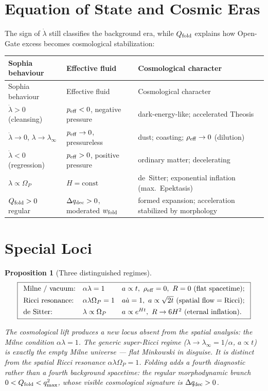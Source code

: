\documentclass[11pt,a4paper]{article}
\newcommand{\Op}{\Omega_P}
\newcommand{\reff}{\rho_{\rm eff}}
\newcommand{\peff}{p_{\rm eff}}
\newcommand{\qdec}{q_{\rm dec}}
\newcommand{\Qfold}{Q_{\rm fold}}
\newcommand{\note}[1]{\textcolor{black!65}{\emph{#1}}}
\theoremstyle{plain}
\newtheorem{proposition}{Proposition}
\theoremstyle{remark}
\theoremstyle{definition}
\begin{document}
\section{Equation of State and Cosmic Eras}
The sign of $\dot\lambda$ still classifies the background era, while $\Qfold$ explains how Open-Gate
excess becomes cosmological stabilization:
\begin{longtable}{>{\raggedright\arraybackslash}p{} >{\raggedright\arraybackslash}p{} >{\raggedright\arraybackslash}p{}}
\toprule
Sophia behaviour & Effective fluid & Cosmological character \\
\midrule
\endfirsthead
\toprule
Sophia behaviour & Effective fluid & Cosmological character \\
\midrule
\endhead
$\dot\lambda>0$ (cleansing) & $\peff<0$, negative pressure & dark-energy-like; accelerated Theosis \\
$\dot\lambda\to0$, $\lambda\to\lambda_\infty$ & $\peff\to0$, pressureless & dust; coasting; $\reff\to0$ (dilution) \\
$\dot\lambda<0$ (regression) & $\peff>0$, positive pressure & ordinary matter; decelerating \\
$\lambda\propto\Op$ & $H=\mathrm{const}$ & de~Sitter; exponential inflation (max.\ Epektasis) \\
$\Qfold>0$ regular & $\Delta\qdec>0$, moderated $w_{\rm fold}$ & formed expansion; acceleration stabilized by morphology \\
\bottomrule
\end{longtable}

\section{Special Loci}\label{sec:loci}
\begin{proposition}[Three distinguished regimes]\label{prop:loci}
\[
\boxed{\begin{array}{lll}
\textnormal{Milne / vacuum:} & \alpha\lambda=1 & a\propto t,\ \reff=0,\ R=0\ (\text{flat spacetime});\\[4pt]
\textnormal{Ricci resonance:} & \alpha\lambda\Op=1 & a\dot a=1,\ a\propto\sqrt{2t}\ (\text{spatial flow}=\text{Ricci});\\[4pt]
\textnormal{de~Sitter:} & \lambda\propto\Op & a\propto e^{Ht},\ R\to6H^2\ (\text{eternal inflation}).
\end{array}}
\]
\end{proposition}
\note{The cosmological lift produces a \emph{new} locus absent from the spatial analysis: the Milne
condition $\alpha\lambda=1$. The generic super-Ricci regime ($\lambda\to\lambda_\infty=1/\alpha$,
$a\propto t$) is exactly the empty Milne universe --- flat Minkowski in disguise. It is distinct from
the spatial Ricci resonance $\alpha\lambda\Op=1$. Folding adds a fourth diagnostic rather than a fourth
background spacetime: the regular morphodynamic branch $0<\Qfold<q_{\max}^2$, whose visible
cosmological signature is $\Delta\qdec>0$.}
\end{document}
